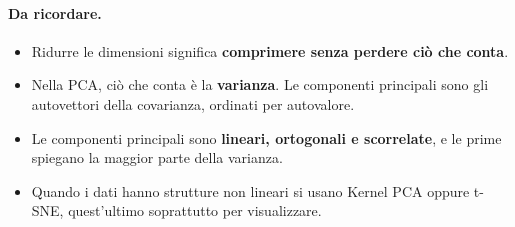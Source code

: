 \paragraph*{Da ricordare.}
\begin{itemize}
    \item Ridurre le dimensioni significa \textbf{comprimere senza perdere ciò che conta}.
    \item Nella PCA, ciò che conta è la \textbf{varianza}. Le componenti principali sono gli autovettori della covarianza, ordinati per autovalore.
    \item Le componenti principali sono \textbf{lineari, ortogonali e scorrelate}, e le prime spiegano la maggior parte della varianza.
    \item Quando i dati hanno strutture non lineari si usano Kernel PCA oppure t-SNE, quest'ultimo soprattutto per visualizzare.
\end{itemize}